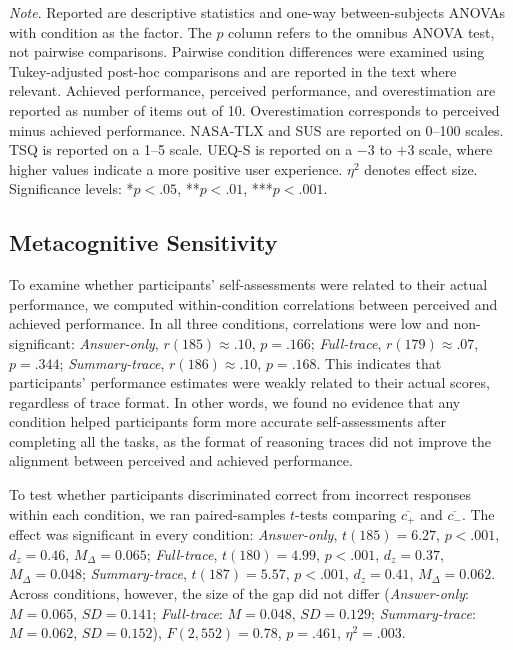 \documentclass[manuscript,review,anonymous]{acmart}
\begin{document}
\begin{table}[!htp]


\raggedright \small \textit{Note}. Reported are descriptive statistics and one-way between-subjects ANOVAs with condition as the factor. The $p$ column refers to the omnibus ANOVA test, not pairwise comparisons. Pairwise condition differences were examined using Tukey-adjusted post-hoc comparisons and are reported in the text where relevant. Achieved performance, perceived performance, and overestimation are reported as number of items out of 10. Overestimation corresponds to perceived minus achieved performance. NASA-TLX and SUS are reported on 0--100 scales. TSQ is reported on a 1--5 scale. UEQ-S is reported on a $-3$ to $+3$ scale, where higher values indicate a more positive user experience. $\eta^2$ denotes effect size. Significance levels: *$p < .05$, **$p < .01$, ***$p < .001$.
\end{table}

\subsection{Metacognitive Sensitivity}


To examine whether participants' self-assessments were related to their actual performance, we computed within-condition correlations between perceived and achieved performance. In all three conditions, correlations were low and non-significant: \textit{Answer-only}, $r(185) \approx .10$, $p = .166$; \textit{Full-trace}, $r(179) \approx .07$, $p = .344$; \textit{Summary-trace}, $r(186) \approx .10$, $p = .168$. This indicates that participants' performance estimates were weakly related to their actual scores, regardless of trace format. In other words, we found no evidence that any condition helped participants form more accurate self-assessments after completing all the tasks, as the format of reasoning traces did not improve the alignment between perceived and achieved performance. 

To test whether participants discriminated correct from incorrect responses within each condition, we ran paired-samples $t$-tests comparing $\overline{c_{+}}$ and
$\overline{c_{-}}$. The effect was significant in every condition: \textit{Answer-only}, $t(185) = 6.27$, $p < .001$, $d_z = 0.46$, $M_{\Delta} = 0.065$; \textit{Full-trace}, $t(180) = 4.99$, $p < .001$, $d_z = 0.37$, $M_{\Delta} = 0.048$; \textit{Summary-trace}, $t(187) = 5.57$,
$p < .001$, $d_z = 0.41$, $M_{\Delta} = 0.062$. Across conditions, however, the size of the gap did not differ (\textit{Answer-only}: $M = 0.065$, $SD = 0.141$; \textit{Full-trace}: $M = 0.048$, $SD = 0.129$; \textit{Summary-trace}: $M = 0.062$, $SD = 0.152$), $F(2, 552) = 0.78$, $p = .461$, $\eta^2 = .003$.%
\end{document}
